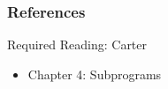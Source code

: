 \documentclass[dvipsnames]{beamer}
\begin{document}
\begin{frame}
  \frametitle{References}

  \begin{block}{Required Reading: Carter}
    \begin{itemize}
      \item Chapter 4: \alert{Subprograms}
    \end{itemize}
  \end{block}
%
\end{frame}
%
%
%
%
%
%
%
%
\end{document}
